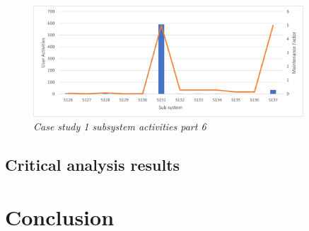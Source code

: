 \begin{figure}[!htb]
	\centering %
	\includegraphics[width=0.9\textwidth]{img/ch3/uat/systemA/s126_s138.png}
	\caption[Case study 1 subsystem activities part 6]
	{\textit{Case study 1 subsystem activities part 6}}\label{fig:ch3_saS126S138}
\end{figure} 

\clearpage

\subsection{Critical analysis results}

\section{Conclusion}